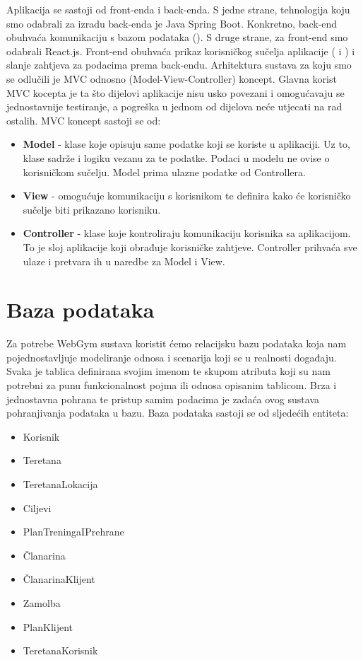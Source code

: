 	\indent Aplikacija se sastoji od front-enda i back-enda. S jedne strane, tehnologija koju smo odabrali za izradu back-enda je Java Spring Boot. Konkretno, back-end obuhvaća komunikaciju s bazom podataka (). S druge strane, za front-end smo odabrali React.js. Front-end obuhvaća prikaz korisničkog sučelja aplikacije ( i ) i slanje zahtjeva za podacima prema back-endu. Arhitektura sustava za koju smo se odlučili je MVC odnosno (Model-View-Controller) koncept. \newline
	\indent Glavna korist MVC kocepta je ta što dijelovi aplikacije nisu usko povezani i omogućavaju se jednostavnije testiranje, a pogreška u jednom od dijelova neće utjecati na rad ostalih. \newline
	MVC koncept sastoji se od:
	\begin{itemize}
		\item   \textbf{Model} - klase koje opisuju same podatke koji se koriste u aplikaciji. Uz to, klase sadrže i logiku vezanu za te podatke. Podaci u modelu ne ovise o korisničkom sučelju. Model prima ulazne podatke od Controllera.

		\item 	\textbf{View} - omogućuje komunikaciju s korisnikom te definira kako će korisničko sučelje biti prikazano korisniku.
		\item 	\textbf{Controller}	- klase koje kontroliraju komunikaciju korisnika sa aplikacijom. To je sloj aplikacije koji obrađuje korisničke zahtjeve. Controller prihvaća sve ulaze i pretvara ih u naredbe za Model i View.   	
	\end{itemize}

	
		\section{Baza podataka}
		Za potrebe WebGym sustava koristit ćemo relacijsku bazu podataka koja nam pojednostavljuje modeliranje odnosa i scenarija koji se u realnosti događaju. Svaka je tablica definirana svojim imenom te skupom atributa koji su nam potrebni za punu funkcionalnost pojma ili odnosa opisanim tablicom. Brza i jednostavna pohrana te pristup samim podacima je zadaća ovog sustava pohranjivanja podataka u bazu. Baza podataka sastoji se od sljedećih entiteta:
		\begin{itemize}
	        	\item 	Korisnik
	        	\item 	Teretana 
	        	\item 	TeretanaLokacija 
	        	\item   Ciljevi
	        	\item 	PlanTreningaIPrehrane
	        	\item 	Članarina
	        	\item 	ČlanarinaKlijent
	        	\item 	Zamolba
	        	\item   PlanKlijent
	        	\item   TeretanaKorisnik
        	\end{itemize}
		
